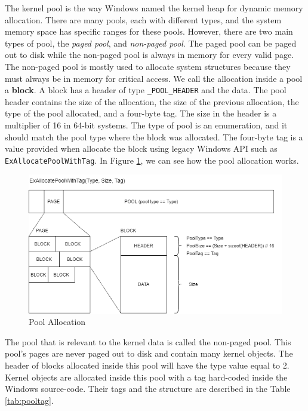 The kernel pool is the way Windows named the kernel heap for dynamic memory
allocation. There are many pools, each with different types, and the system
memory space has specific ranges for these pools. However, there are two main
types of pool, the \textit{paged pool}, and \textit{non-paged pool}. The paged
pool can be paged out to disk while the non-paged pool is always in memory for
every valid page. The non-paged pool is mostly used to allocate system
structures because they must always be in memory for critical access.  We call
the allocation inside a pool a \textbf{block}. A block has a header of type
\texttt{\_POOL\_HEADER} and the data. The pool header contains the size of the
allocation, the size of the previous allocation, the type of the pool
allocated, and a four-byte tag. The size in the header is a multiplier of 16 in
64-bit systems.  The type of pool is an enumeration, and it should match the
pool type where the block was allocated.  The four-byte tag is a value provided
when allocate the block using legacy Windows API such as
\texttt{ExAllocatePoolWithTag}. In Figure \ref{fig:pooltag}, we can see how the
pool allocation works.

\begin{figure}[h]
  \centering
  \caption{Pool Allocation}
  \label{fig:pooltag}
  \includegraphics[scale=0.7]{images/pooltag.png}
\end{figure}

The pool that is relevant to the kernel data is called the non-paged pool. This
pool's pages are never paged out to disk and contain many kernel objects.  The
header of blocks allocated inside this pool will have the type value equal to
2. Kernel objects are allocated inside this pool with a tag hard-coded inside
the Windows source-code. Their tags and the structure are described in the
Table \ref{tab:pooltag}.

